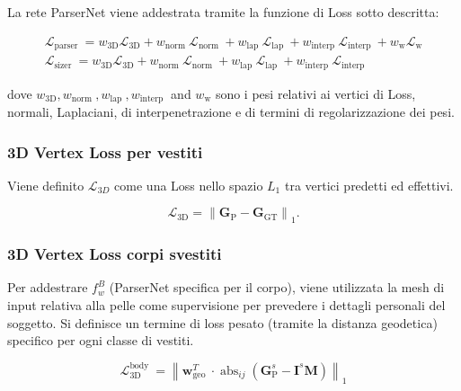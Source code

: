 \medskip

La rete ParserNet viene addestrata tramite la funzione di Loss sotto descritta: 
\medskip

\begin{equation*}
\begin{gathered}
\mathcal{L}_{\text {parser }}=w_{3 \mathrm{D}} \mathcal{L}_{3 \mathrm{D}}+w_{\text {norm }} \mathcal{L}_{\text {norm }}+w_{\text {lap }} \mathcal{L}_{\text {lap }}+w_{\text {interp }} \mathcal{L}_{\text {interp }}+w_{\mathrm{w}} \mathcal{L}_{\mathrm{w}} \\
\mathcal{L}_{\text {sizer }}=w_{3 \mathrm{D}} \mathcal{L}_{3 \mathrm{D}}+w_{\text {norm }} \mathcal{L}_{\text {norm }}+w_{\text {lap }} \mathcal{L}_{\text {lap }}+w_{\text {interp }} \mathcal{L}_{\text {interp }}
\end{gathered}
\end{equation*}

\medskip

dove $w_{3 \mathrm{D}}, w_{\text {norm }}, w_{\text {lap }}, w_{\text {interp }}$ and $w_{\mathrm{w}}$ sono i pesi relativi ai vertici di Loss, normali, Laplaciani, di interpenetrazione e di termini di regolarizzazione dei pesi.

\subsubsection{3D Vertex Loss per vestiti}

\medskip

Viene definito $\mathcal{L}_{3 D}$ come una Loss nello spazio $L_{1}$ tra vertici predetti ed effettivi.

\medskip

$$
\mathcal{L}_{3 \mathrm{D}}=\left\|\mathbf{G}_{\mathrm{P}}-\mathbf{G}_{\mathrm{GT}}\right\|_{1} .
$$

\medskip

\subsubsection{3D Vertex Loss corpi svestiti}

Per addestrare $f_{w}^{B}$ (ParserNet specifica per il corpo), viene utilizzata la mesh di input relativa alla pelle come supervisione per prevedere i dettagli personali del soggetto. Si definisce un termine di loss pesato (tramite la distanza geodetica) specifico per ogni classe di vestiti. 

\medskip

$$
\mathcal{L}_{3 \mathrm{D}}^{\text {body }}=\left\|\boldsymbol{w}_{\text {geo }}^{T} \cdot \operatorname{abs}_{i j}\left(\mathbf{G}_{\mathrm{P}}^{s}-\mathbf{I}^{s} \mathbf{M}\right)\right\|_{1}
$$

